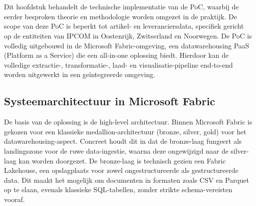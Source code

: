 
\chapter{}%
\label{ch:poc}


Dit hoofdstuk behandelt de technische implementatie van de PoC, waarbij de eerder besproken theorie en methodologie worden omgezet in de praktijk. De scope van deze PoC is beperkt tot artikel- en leveranciersdata, specifiek gericht op de entiteiten van IPCOM in Oostenrijk, Zwitserland en Noorwegen. De PoC is volledig uitgebouwd in de Microsoft Fabric-omgeving, een datawarehousing PaaS (Platform as a Service) die een all-in-one oplossing biedt. Hierdoor kan de volledige extractie-, transformatie-, laad- en visualisatie-pipeline end-to-end worden uitgewerkt in een geïntegreerde omgeving.

\section{Systeemarchitectuur in Microsoft Fabric}%
\label{sec:poc-architectuur}


De basis van de oplossing is de high-level architectuur. Binnen Microsoft Fabric is gekozen voor een klassieke medallion-architectuur (bronze, silver, gold) voor het datawarehousing-aspect. Concreet houdt dit in dat de bronze-laag fungeert als landingszone voor de ruwe data-ingestie, waarna deze ongewijzigd naar de silver-laag kan worden doorgezet. De bronze-laag is technisch gezien een Fabric Lakehouse, een opslagplaats voor zowel ongestructureerde als gestructureerde data. Dit maakt het mogelijk om documenten in formaten zoals CSV en Parquet op te slaan, evenals klassieke SQL-tabellen, zonder strikte schema-vereisten vooraf.

